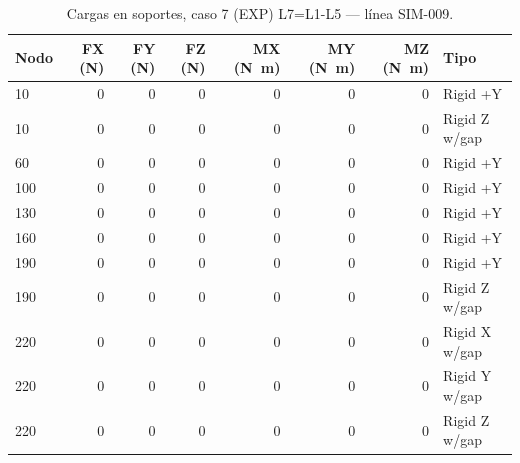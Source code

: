 \begin{table}[htbp]
  \centering
  \footnotesize
  \caption{Cargas en soportes, caso 7 (EXP) L7=L1-L5 — línea SIM-009.}
  \label{tab:restricciones-exp}
  \begin{tabular}{lrrrrrrl}
    \toprule
    Nodo & FX (\si{N}) & FY (\si{N}) & FZ (\si{N}) & MX (\si{N.m}) & MY (\si{N.m}) & MZ (\si{N.m}) & Tipo \\
    \midrule
    10 & \num{0} & \num{0} & \num{0} & \num{0} & \num{0} & \num{0} & Rigid +Y \\
    10 & \num{0} & \num{0} & \num{0} & \num{0} & \num{0} & \num{0} & Rigid Z w/gap \\
    60 & \num{0} & \num{0} & \num{0} & \num{0} & \num{0} & \num{0} & Rigid +Y \\
    100 & \num{0} & \num{0} & \num{0} & \num{0} & \num{0} & \num{0} & Rigid +Y \\
    130 & \num{0} & \num{0} & \num{0} & \num{0} & \num{0} & \num{0} & Rigid +Y \\
    160 & \num{0} & \num{0} & \num{0} & \num{0} & \num{0} & \num{0} & Rigid +Y \\
    190 & \num{0} & \num{0} & \num{0} & \num{0} & \num{0} & \num{0} & Rigid +Y \\
    190 & \num{0} & \num{0} & \num{0} & \num{0} & \num{0} & \num{0} & Rigid Z w/gap \\
    220 & \num{0} & \num{0} & \num{0} & \num{0} & \num{0} & \num{0} & Rigid X w/gap \\
    220 & \num{0} & \num{0} & \num{0} & \num{0} & \num{0} & \num{0} & Rigid Y w/gap \\
    220 & \num{0} & \num{0} & \num{0} & \num{0} & \num{0} & \num{0} & Rigid Z w/gap \\
    \bottomrule
  \end{tabular}
\end{table}

